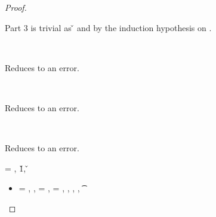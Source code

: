 \begin{lemma}
\begin{proof}
\begin{case}[B-IfTrue]
\begin{itemize}
\begin{subcase}[T-If]
              Part 3 is trivial as
              \opsem {\openv{}} {} {\v{}}
              and {\judgementtwo{}{\v{}}{\t{}}} by the induction hypothesis on {}.

      \end{subcase}
  \end{itemize}
\end{case}

\begin{case}[BE-If]
  \ 

  Reduces to an error.
\end{case}

\begin{case}[BE-IfFalse]
  \ 

  Reduces to an error.
\end{case}

\begin{case}[BE-IfTrue]
  \ 

  Reduces to an error.
\end{case}

\begin{case}[B-Let]
  \e{} = { {} {}},
        \opsem {\openv{}} {} {\v{1}},
         {} {\v{}}


  \begin{itemize}
    \item[]
      \begin{subcase}[T-Let]
  \ep{} = { {} {}},
  \judgementrewrite {\propenv{}} {} {\s{}} { {}}
             {}
             {},
             \propp{} = {\impprop {\notprop {\falsy{}} {\x{}}} {}},
             \proppp{} = {\impprop {\isprop {\falsy{}} {\x{}}} {}},
  \judgementrewrite
       {\propenv{}, {\isprop {\s{}} {\x{}}},
         {\propp{}},
         {\proppp{}}}
             {} {\t{}} {\filterset {\thenprop {\prop{}}} {\elseprop {\prop{}}}}
             {\object{}} 
             {}


\end{subcase}
\end{itemize}
\end{case}
\end{proof}
\end{lemma}
